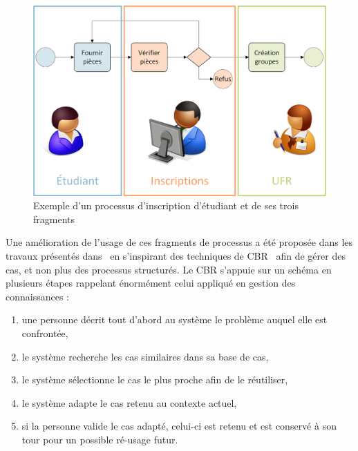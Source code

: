 \begin{figure}[ht]
\centering
\centerline{
\includegraphics[scale=0.65]{2-Etat-de-l'Art/images/KIP/Fragments/FragmentsProcessus.png}
}
\caption{Exemple d'un processus d'inscription d'étudiant et de ses trois fragments}
\label{figure:2-S1-KIP-Exemple-Fragments}
\end{figure}

\bigskip

Une amélioration de l'usage de ces fragments de processus a été proposée dans les travaux présentés dans~\cite{cognini2016case} en s'inspirant des techniques de CBR~\cite{slade1991case}\cite{kolodner1992introduction} afin de gérer des cas, et non plus des processus structurés.
Le CBR s'appuie sur un schéma en plusieurs étapes rappelant énormément celui appliqué en gestion des connaissances :
\begin{enumerate}
\item une personne décrit tout d'abord au système le problème auquel elle est confrontée,
\item le système recherche les cas similaires dans sa base de cas,
\item le système sélectionne le cas le plus proche afin de le réutiliser,
\item le système adapte le cas retenu au contexte actuel,
\item si la personne valide le cas adapté, celui-ci est retenu et est conservé à son tour pour un possible ré-usage futur.
\end{enumerate}

